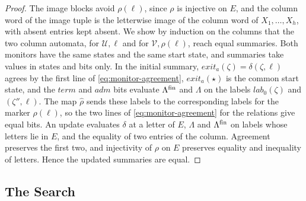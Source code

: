\begin{proof}
The image blocks avoid $\rho(\ell)$, since $\rho$ is injective on $E$, and
the column word of the image tuple is the letterwise image of the column
word of $X_1,\ldots,X_h$, with absent entries kept absent. We show by
induction on the columns that the two column automata, for $\mathcal U,\ell$
and for $\mathcal V,\rho(\ell)$, reach equal summaries. Both monitors have
the same states and the same start state, and summaries take values in
states and bits only. In the initial summary,
$\mathit{exit}_a(\zeta)=\delta(\zeta,\ell)$ agrees by the first line of
\eqref{eq:monitor-agreement}, $\mathit{exit}_a(\star)$ is the common start
state, and the $\mathit{term}$ and $\mathit{adm}$ bits evaluate $\Lambda^{\mathrm{fin}}$ and
$\Lambda$ on the labels $\mathit{lab}_0(\zeta)$ and $(\zeta'',\ell)$. The map
$\widehat\rho$ sends these labels to the corresponding labels for the marker
$\rho(\ell)$, so the two lines of \eqref{eq:monitor-agreement} for the
relations give equal bits. An update evaluates $\delta$ at a letter of $E$,
$\Lambda$ and $\Lambda^{\mathrm{fin}}$ on labels whose letters lie in $E$, and the equality of
two entries of the column. Agreement preserves the first two, and
injectivity of $\rho$ on $E$ preserves equality and inequality of letters.
Hence the updated summaries are equal.
\end{proof}

\subsection{The Search}

